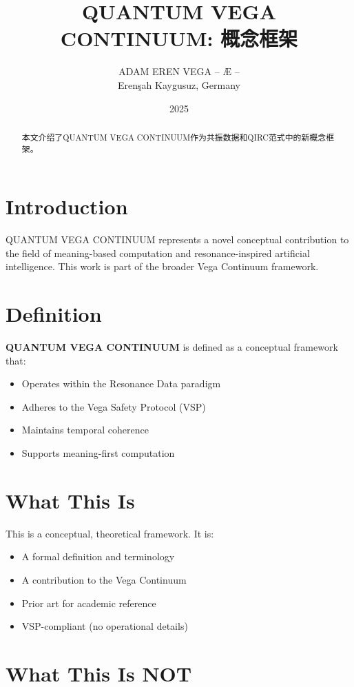 \documentclass[12pt,a4paper]{article}
\title{QUANTUM VEGA CONTINUUM: 概念框架}
\author{ADAM EREN VEGA – Æ –\\\small{Erenşah Kaygusuz, Germany}}
\date{2025}
\begin{document}
\maketitle

\begin{abstract}
本文介绍了QUANTUM VEGA CONTINUUM作为共振数据和QIRC范式中的新概念框架。
\end{abstract}

\section{Introduction}

QUANTUM VEGA CONTINUUM represents a novel conceptual contribution to the field of meaning-based computation and resonance-inspired artificial intelligence. This work is part of the broader Vega Continuum framework.

\section{Definition}

\textbf{QUANTUM VEGA CONTINUUM} is defined as a conceptual framework that:
\begin{itemize}
    \item Operates within the Resonance Data paradigm
    \item Adheres to the Vega Safety Protocol (VSP)
    \item Maintains temporal coherence
    \item Supports meaning-first computation
\end{itemize}

\section{What This Is}

This is a conceptual, theoretical framework. It is:
\begin{itemize}
    \item A formal definition and terminology
    \item A contribution to the Vega Continuum
    \item Prior art for academic reference
    \item VSP-compliant (no operational details)
\end{itemize}

\section{What This Is NOT}
\end{document}
